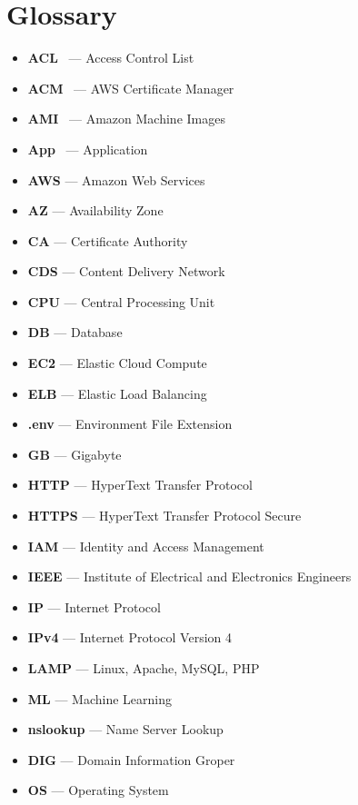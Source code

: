 \chapter{Glossary}\label{ch:glossary}

\begin{itemize}
    \item  \textbf{ACL} \   — Access Control List
    \item  \textbf{ACM} \   — AWS Certificate Manager
    \item  \textbf{AMI} \   — Amazon Machine Images
    \item  \textbf{App} \   — Application
    \item  \textbf{AWS} \tab— Amazon Web Services
    \item  \textbf{AZ} \tab— Availability Zone
    \item  \textbf{CA} \tab— Certificate Authority
    \item  \textbf{CDS} \tab— Content Delivery Network
    \item  \textbf{CPU} \tab— Central Processing Unit
    \item  \textbf{DB} \tab— Database
    \item  \textbf{EC2} \tab— Elastic Cloud Compute
    \item  \textbf{ELB} \tab— Elastic Load Balancing
    \item  \textbf{.env} \tab— Environment File Extension
    \item  \textbf{GB} \tab— Gigabyte
    \item  \textbf{HTTP} \tab— HyperText Transfer Protocol
    \item  \textbf{HTTPS} \tab— HyperText Transfer Protocol Secure
    \item  \textbf{IAM} \tab— Identity and Access Management
    \item  \textbf{IEEE} \tab— Institute of Electrical and Electronics Engineers
    \item  \textbf{IP} \tab— Internet Protocol
    \item  \textbf{IPv4} \tab— Internet Protocol Version 4
    \item  \textbf{LAMP} \tab— Linux, Apache, MySQL, PHP
    \item  \textbf{ML} \tab— Machine Learning
    \item  \textbf{nslookup} \tab— Name Server Lookup
    \item  \textbf{DIG} \tab— Domain Information Groper
    \item  \textbf{OS} \tab— Operating System

\end{itemize}

